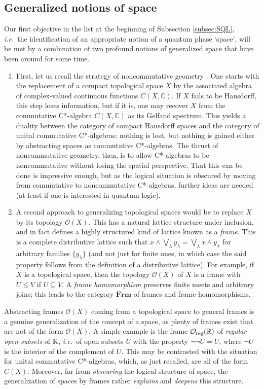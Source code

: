 \documentclass[12pt]{article}
\newcommand{\CO}{{\mathcal O}} \newcommand{\CP}{{\mathcal P}}
\newcommand{\C}{{\mathbb C}} \newcommand{\D}{{\mathbb D}}
\newcommand{\ie}{\textit{i.e.}}
\begin{document}
\subsection{Generalized notions of space}\label{subsection:locale1}
Our first objective in the list at the beginning of Subsection \ref{subsec:SQL}, \ie\ the identification of an appropriate notion of a quantum phase `space',
will be met by a combination of two profound notions of generalized space
that have been around for some time.
\begin{enumerate}
\item
First, let us recall the strategy of
noncommutative geometry  \cite{Connes,ConnesMarcolli}.
 One starts
with the replacement of a compact topological space $X$  by the
associated algebra of complex-valued continuous functions $C(X,\C)$. If
$X$ fails to be Hausdorff, this step loses information, but if it is,
one may recover $X$ from the commutative C*-algebra $C(X,\C)$ as its
Gelfand spectrum. This yields a duality between the category
of compact Hausdorff spaces and the category of unital commutative
C*-algebras: nothing is lost, but nothing is gained either by
abstracting spaces as commutative C*-algebras. The thrust of noncommutative geometry, then, is to allow C*-algebras to be noncommutative
without losing the spatial perspective. That this can be done is
impressive enough, but as the logical situation is obscured by moving from
commutative to noncommutative C*-algebras, further ideas are needed (at least if one is interested in quantum logic).
\item
A second  approach to generalizing  topological spaces
 would be to replace $X$  by its topology $\CO(X)$. This has a natural lattice structure under inclusion, and in fact defines a highly structured kind of lattice known as a
{\it frame}. This is  a complete distributive lattice such that
$x\wedge \bigvee_{\lambda}y_{\lambda}=\bigvee_{\lambda}x\wedge
y_{\lambda}$ for arbitrary families $\{y_{\lambda}\}$ (and not just for finite ones, in which case the said property follows from the definition of a distributive lattice).  For  example, if $X$ is a topological space, then the
topology $\CO(X)$ of $X$ is a frame with $U\leqslant V$ if $U\subseteq V$.
A {\it frame homomorphism} preserves finite meets and arbitrary
joins; this leads to the category $\mathbf{Frm}$  of frames and frame homomorphisms.
\end{enumerate}
Abstracting frames  $\CO(X)$ coming from a topological space  to general frames  is a genuine generalization of the concept of a space, as plenty of frames exist that are not of
the form $\CO(X)$. A simple example is the frame $\CO_{\mathrm{reg}}(\R)$ of {\it regular open subsets} of ${\mathbb R}$, \ie\ of open subsets $U$ with the property $\neg\neg U=U$, where $\neg U$ is the interior of the complement of $U$.
This may be contrasted with the situation for unital commutative
C*-algebras, which, as just recalled, are all  of the form $C(X)$. Moreover, far from {\it obscuring} the logical structure of space, the generalization of spaces by frames  rather {\it explains} and {\it deepens}  this structure.
\end{document}
